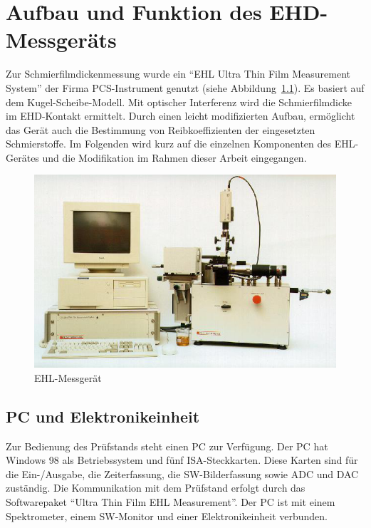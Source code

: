 \chapter{Aufbau und Funktion des EHD-Messgeräts}
\label{chap:aufbau_und_funktion_des_ehd_messgeraets}

Zur Schmierfilmdickenmessung wurde ein ``EHL Ultra Thin Film Measurement System'' der Firma PCS-Instrument genutzt (siehe Abbildung~\ref{fig:ehl_messgeraet}).
Es basiert auf dem Kugel-Scheibe-Modell.
Mit optischer Interferenz wird die Schmierfilmdicke im EHD-Kontakt ermittelt.
Durch einen leicht modifizierten Aufbau, ermöglicht das Gerät auch die Bestimmung von Reibkoeffizienten der eingesetzten Schmierstoffe.
Im Folgenden wird kurz auf die einzelnen Komponenten des EHL-Gerätes und die Modifikation im Rahmen dieser Arbeit eingegangen.

\begin{figure}[htb]
    \centering
    \includegraphics[width=0.8\linewidth]{./images/ehl_pruefstand.png}
    \caption{EHL-Messgerät~\cite{ehl}}
    \label{fig:ehl_messgeraet}
\end{figure}

\section{PC und Elektronikeinheit}
\label{sec:pc_elektronikeinheit}

Zur Bedienung des Prüfstands steht einen PC zur Verfügung.
Der PC hat Windows 98 als Betriebssystem und fünf ISA-Steckkarten.
Diese Karten sind für die Ein-/Ausgabe, die Zeiterfassung, die SW-Bilderfassung sowie ADC und DAC zuständig.
Die Kommunikation mit dem Prüfstand erfolgt durch das Softwarepaket ``Ultra Thin Film EHL Measurement''.
Der PC ist mit einem Spektrometer, einem SW-Monitor und einer Elektronikeinheit verbunden.

